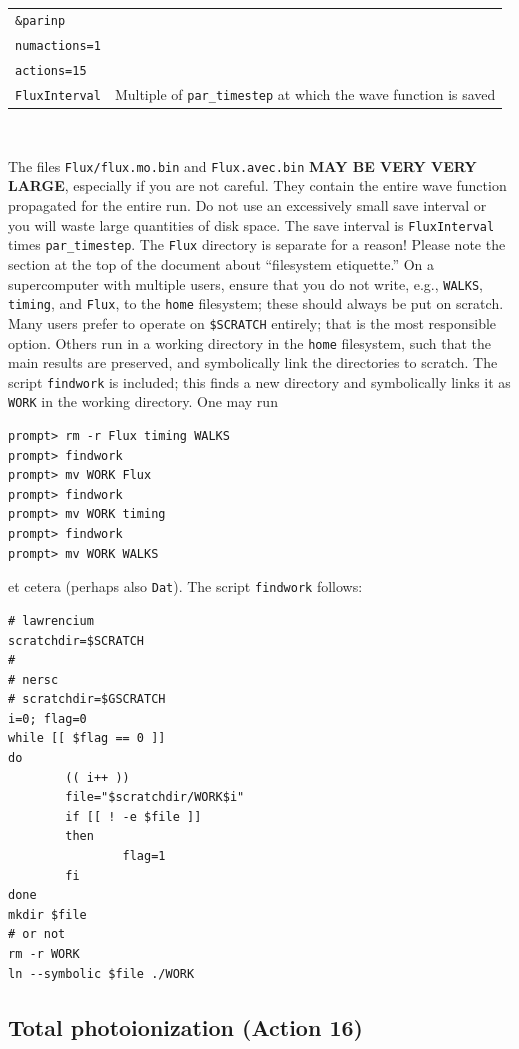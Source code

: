 \documentclass[10pt,leqno, oneside]{book}
\begin{document}
\

{\footnotesize
\begin{tabular}{ll}
\verb#&parinp# & \\
\verb#numactions=1# & \\
\verb#actions=15# & \\
\verb#FluxInterval# & Multiple of \verb#par_timestep# at which the wave function is saved \\
\end{tabular}}

\

The files \verb#Flux/flux.mo.bin# and 
\verb#Flux.avec.bin#
%
\textbf{MAY BE VERY VERY LARGE}, especially if you are not careful.
They contain the entire wave function propagated for the entire run.  Do not use an excessively
small save interval or you will waste large quantities of disk space.  The save interval is \verb#FluxInterval# times \verb#par_timestep#.  The \verb#Flux# directory
is separate for a reason!  Please note the section at the top of the document about ``filesystem etiquette.''  On a supercomputer with multiple users, ensure that
you do not write, e.g., \verb#WALKS#, \verb#timing#, and \verb#Flux#, to the \verb#home# filesystem; these should always be put on scratch.  Many users
prefer to operate on \verb#$SCRATCH# entirely; that is the most responsible option.  Others run in a working directory in the \verb#home# filesystem, such
that the main results are preserved, and symbolically link the directories to scratch.  The script \verb#findwork# is included; this finds a new directory and symbolically
links it as \verb#WORK# in the working directory.  One may run
{\footnotesize
\begin{verbatim}
prompt> rm -r Flux timing WALKS
prompt> findwork
prompt> mv WORK Flux
prompt> findwork
prompt> mv WORK timing
prompt> findwork
prompt> mv WORK WALKS
\end{verbatim}}
et cetera (perhaps also \verb#Dat#).  The script \verb#findwork# follows:
{\footnotesize
\begin{verbatim}
# lawrencium
scratchdir=$SCRATCH
#
# nersc
# scratchdir=$GSCRATCH
i=0; flag=0
while [[ $flag == 0 ]]
do
        (( i++ ))
        file="$scratchdir/WORK$i"
        if [[ ! -e $file ]]
        then
                flag=1
        fi
done
mkdir $file
# or not
rm -r WORK
ln --symbolic $file ./WORK
\end{verbatim}}

\subsection{Total photoionization (Action 16)}
\end{document}

